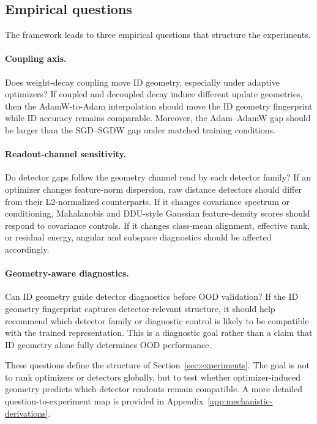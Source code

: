 \subsection{Empirical questions}
\label{subsec:empirical-questions}

The framework leads to three empirical questions that structure the experiments.

\paragraph{Coupling axis.}
Does weight-decay coupling move ID geometry, especially under adaptive
optimizers? If coupled and decoupled decay induce different update geometries,
then the AdamW-to-Adam interpolation should move the ID geometry fingerprint
while ID accuracy remains comparable. Moreover, the Adam--AdamW gap should be
larger than the SGD--SGDW gap under matched training conditions.

\paragraph{Readout-channel sensitivity.}
Do detector gaps follow the geometry channel read by each detector family? If an
optimizer changes feature-norm dispersion, raw distance detectors should differ
from their L2-normalized counterparts. If it changes covariance spectrum or
conditioning, Mahalanobis and DDU-style Gaussian feature-density scores should
respond to covariance controls. If it changes class-mean alignment, effective
rank, or residual energy, angular and subspace diagnostics should be affected
accordingly.

\paragraph{Geometry-aware diagnostics.}
Can ID geometry guide detector diagnostics before OOD validation? If the ID
geometry fingerprint captures detector-relevant structure, it should help
recommend which detector family or diagnostic control is likely to be compatible
with the trained representation. This is a diagnostic goal rather than a claim
that ID geometry alone fully determines OOD performance.

These questions define the structure of Section~\ref{sec:experiments}. The goal
is not to rank optimizers or detectors globally, but to test whether
optimizer-induced geometry predicts which detector readouts remain compatible. A
more detailed question-to-experiment map is provided in
Appendix~\ref{app:mechanistic-derivations}.
